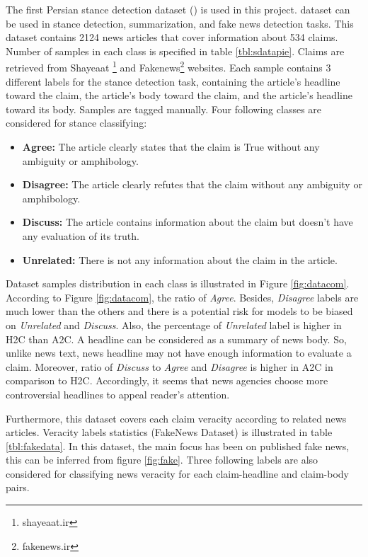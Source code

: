 The first Persian stance detection dataset (\cite{stance_persian})  is used in this project. \cite{stance_persian} dataset can be used in stance detection, summarization, and fake news detection tasks. This dataset contains 2124 news articles that cover information about 534 claims. Number of samples in each class is specified in table \ref{tbl:sdatapie}. Claims are retrieved from Shayeaat \footnote{shayeaat.ir} and Fakenews\footnote{fakenews.ir} websites. Each sample contains 3 different labels for the stance detection task, containing the article's headline toward the claim, the article's body toward the claim, and the article's headline toward its body. Samples are tagged manually. Four following classes are considered for stance classifying:
\begin{itemize}
	\item {\color{green!70!black}\textbf{Agree:}} The article clearly states that the claim is True without any ambiguity or amphibology. 
	\item {\color{red!70!black}\textbf{Disagree:}} The article clearly refutes that the claim without any ambiguity or amphibology. 
	\item {\color{yellow!70!black}\textbf{Discuss:}} The article contains information about the claim but doesn't have any evaluation of its truth. 
	\item {\color{gray!}\textbf{Unrelated:}} There is not any information about the claim in the article.
\end{itemize}
Dataset samples distribution in each class is illustrated in Figure \ref{fig:datacom}. According to Figure \ref{fig:datacom}, the ratio of \textit{Agree}. Besides, \textit{Disagree} labels are much lower than the others and there is a potential risk for models to be biased on \textit{Unrelated} and \textit{Discuss}. Also, the percentage of \textit{Unrelated} label is higher in \ac{H2C} than \ac{A2C}. A headline can be considered as a summary of news body. So, unlike news text, news headline may not have enough information to evaluate a claim.  Moreover, ratio of \textit{Discuss} to \textit{Agree} and \textit{Disagree} is higher in \ac{A2C} in comparison to \ac{H2C}. Accordingly, it seems that news agencies choose more controversial headlines to appeal reader's attention.

Furthermore, this dataset covers each claim veracity according to related news articles. Veracity labels statistics (FakeNews Dataset) is illustrated in table \ref{tbl:fakedata}. In this dataset, the main focus has been on published fake news, this can be inferred from figure \ref{fig:fake}. Three following labels are also considered for classifying news veracity for each claim-headline and claim-body pairs.

